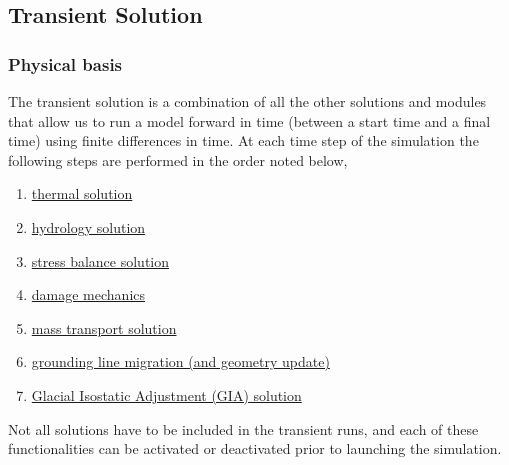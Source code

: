 
\subsection{Transient Solution} \label{sec:using-issm-capabilities-transient}
\subsubsection{Physical basis}
The transient solution is a combination of all the other solutions and modules that allow us to run a model forward in time (between a start time and a final time) using finite differences in time. At each time step of the simulation the following steps are performed in the order noted below,
\begin{enumerate}
	\item \hyperref[sec:using-issm-capabilities-thermal]{thermal solution}
	\item \hyperref[sec:using-issm-capabilities-hydrology]{hydrology solution}
	\item \hyperref[sec:using-issm-capabilities-stress-balance]{stress balance solution}
	\item \hyperref[sec:using-issm-capabilities-damage]{damage mechanics}
	\item \hyperref[sec:using-issm-capabilities-mass-transport]{mass transport solution}
	\item \hyperref[sec:using-issm-capabilities-grounding-lines]{grounding line migration (and geometry update)}
	\item \hyperref[sec:using-issm-capabilities-gia]{Glacial Isostatic Adjustment (GIA) solution}
\end{enumerate}

Not all solutions have to be included in the transient runs, and each of these functionalities can be activated or deactivated prior to launching the simulation.

